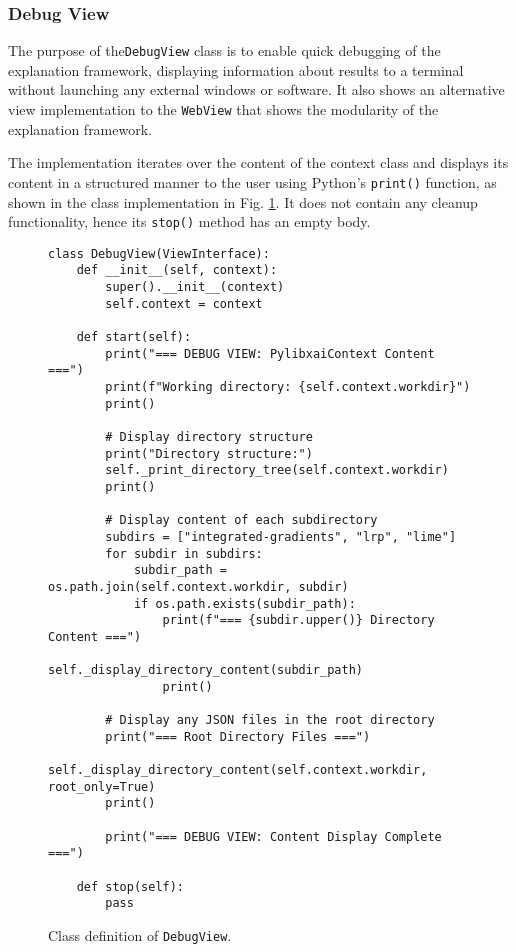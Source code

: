 \documentclass[
    bindingoffset=5mm,  %
    footnoteindent=3mm, %
    hyphenation=true    %
]{src/wut-thesis}
\begin{document}
\subsubsection{Debug View}

The purpose of the\texttt{DebugView} class is to enable quick debugging of the explanation
framework, displaying information about results to a terminal without launching any external windows or software.
It also shows an alternative view implementation to the \texttt{WebView} that shows the modularity of the explanation framework.

The implementation iterates over the content of the context class and displays its content in a structured manner to the user
using Python's \texttt{print()} function, as shown in the class implementation in Fig. \ref{fig:DebugView}. It does not contain any cleanup functionality, hence its \texttt{stop()} method has an empty body.

\begin{figure}%
\begin{verbatim}
class DebugView(ViewInterface):
    def __init__(self, context):
        super().__init__(context)
        self.context = context

    def start(self):
        print("=== DEBUG VIEW: PylibxaiContext Content ===")
        print(f"Working directory: {self.context.workdir}")
        print()
        
        # Display directory structure
        print("Directory structure:")
        self._print_directory_tree(self.context.workdir)
        print()
        
        # Display content of each subdirectory
        subdirs = ["integrated-gradients", "lrp", "lime"]
        for subdir in subdirs:
            subdir_path = os.path.join(self.context.workdir, subdir)
            if os.path.exists(subdir_path):
                print(f"=== {subdir.upper()} Directory Content ===")
                self._display_directory_content(subdir_path)
                print()
        
        # Display any JSON files in the root directory
        print("=== Root Directory Files ===")
        self._display_directory_content(self.context.workdir, root_only=True)
        print()
        
        print("=== DEBUG VIEW: Content Display Complete ===")

    def stop(self):
        pass
\end{verbatim}
\caption{Class definition of \texttt{DebugView}.}
\label{fig:DebugView}
\end{figure}
\end{document}
